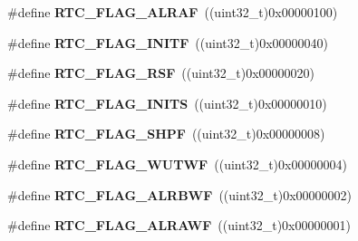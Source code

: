 \begin{DoxyCompactItemize}
\item 
\hypertarget{group___r_t_c___flags___definitions_gaf9e1a4b5eedd674d7b35ae334877ba12}{\#define {\bfseries R\-T\-C\-\_\-\-F\-L\-A\-G\-\_\-\-A\-L\-R\-A\-F}~((uint32\-\_\-t)0x00000100)}\label{group___r_t_c___flags___definitions_gaf9e1a4b5eedd674d7b35ae334877ba12}

\item 
\hypertarget{group___r_t_c___flags___definitions_ga8d973d7f6b07e80743e05d6822ff2147}{\#define {\bfseries R\-T\-C\-\_\-\-F\-L\-A\-G\-\_\-\-I\-N\-I\-T\-F}~((uint32\-\_\-t)0x00000040)}\label{group___r_t_c___flags___definitions_ga8d973d7f6b07e80743e05d6822ff2147}

\item 
\hypertarget{group___r_t_c___flags___definitions_ga78c4245996bef8d5f39226b6e37ed9c0}{\#define {\bfseries R\-T\-C\-\_\-\-F\-L\-A\-G\-\_\-\-R\-S\-F}~((uint32\-\_\-t)0x00000020)}\label{group___r_t_c___flags___definitions_ga78c4245996bef8d5f39226b6e37ed9c0}

\item 
\hypertarget{group___r_t_c___flags___definitions_gae6a2d26d4b10670f6506b14971f52fd2}{\#define {\bfseries R\-T\-C\-\_\-\-F\-L\-A\-G\-\_\-\-I\-N\-I\-T\-S}~((uint32\-\_\-t)0x00000010)}\label{group___r_t_c___flags___definitions_gae6a2d26d4b10670f6506b14971f52fd2}

\item 
\hypertarget{group___r_t_c___flags___definitions_ga8fd11878d6285ab5d35966d598d5e6f9}{\#define {\bfseries R\-T\-C\-\_\-\-F\-L\-A\-G\-\_\-\-S\-H\-P\-F}~((uint32\-\_\-t)0x00000008)}\label{group___r_t_c___flags___definitions_ga8fd11878d6285ab5d35966d598d5e6f9}

\item 
\hypertarget{group___r_t_c___flags___definitions_ga24648116b32442d30da74c497e2e88ae}{\#define {\bfseries R\-T\-C\-\_\-\-F\-L\-A\-G\-\_\-\-W\-U\-T\-W\-F}~((uint32\-\_\-t)0x00000004)}\label{group___r_t_c___flags___definitions_ga24648116b32442d30da74c497e2e88ae}

\item 
\hypertarget{group___r_t_c___flags___definitions_gae9dd4b5b8059937c3422bc1e3eae3ced}{\#define {\bfseries R\-T\-C\-\_\-\-F\-L\-A\-G\-\_\-\-A\-L\-R\-B\-W\-F}~((uint32\-\_\-t)0x00000002)}\label{group___r_t_c___flags___definitions_gae9dd4b5b8059937c3422bc1e3eae3ced}

\item 
\hypertarget{group___r_t_c___flags___definitions_gaf4913efa96d03ded991b1cdddd6b7823}{\#define {\bfseries R\-T\-C\-\_\-\-F\-L\-A\-G\-\_\-\-A\-L\-R\-A\-W\-F}~((uint32\-\_\-t)0x00000001)}\label{group___r_t_c___flags___definitions_gaf4913efa96d03ded991b1cdddd6b7823}


\end{DoxyCompactItemize}
